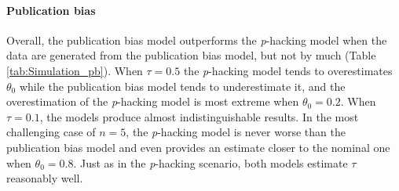 \documentclass{article}
\theoremstyle{plain}
\theoremstyle{definition}
\begin{document}
\paragraph{Publication bias} 
Overall, the publication bias model outperforms the \textit{p}-hacking model when the data are generated from the publication bias model, but not by much (Table \ref{tab:Simulation_pb}). When $\tau = 0.5$ the \textit{p}-hacking model tends to overestimates $\theta_0$ while the publication bias model tends to underestimate it, and the overestimation of the \textit{p}-hacking model is most extreme when $\theta_0 = 0.2$. When $\tau = 0.1$, the models produce almost indistinguishable results. In the most challenging case of $n=5$, the \textit{p}-hacking model is never worse than the publication bias model and even provides an estimate closer to the nominal one when $\theta_0 = 0.8$. Just as in the \textit{p}-hacking scenario, both models estimate $\tau$ reasonably well.
\end{document}

